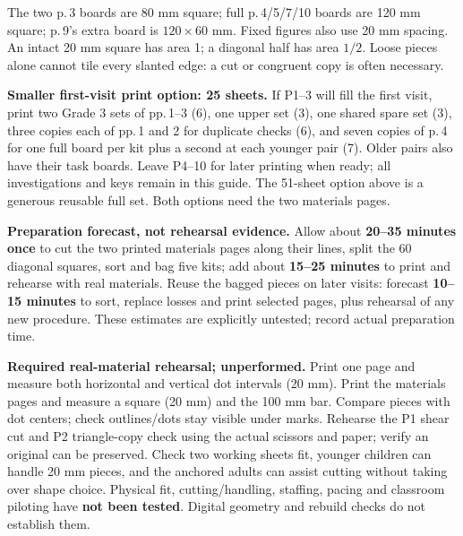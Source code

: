 \documentclass[letterpaper,11pt]{article}
\newcommand{\heading}[1]{\vspace{3pt}{\large\bfseries #1}\par}
\begin{document}
The two p.\,3 boards are 80 mm square; full p.\,4/5/7/10 boards are 120 mm square; p.\,9's extra board is $120\times60$ mm. Fixed figures also use 20 mm spacing. An intact 20 mm square has area 1; a diagonal half has area $1/2$. Loose pieces alone cannot tile every slanted edge: a cut or congruent copy is often necessary.

\textbf{Smaller first-visit print option: 25 sheets.} If P1--3 will fill the first visit, print two Grade 3 sets of pp.\,1--3 (6), one upper set (3), one shared spare set (3), three copies each of pp.\,1 and 2 for duplicate checks (6), and seven copies of p.\,4 for one full board per kit plus a second at each younger pair (7). Older pairs also have their task boards. Leave P4--10 for later printing when ready; all investigations and keys remain in this guide. The 51-sheet option above is a generous reusable full set. Both options need the two materials pages.

\textbf{Preparation forecast, not rehearsal evidence.} Allow about \textbf{20--35 minutes once} to cut the two printed materials pages along their lines, split the 60 diagonal squares, sort and bag five kits; add about \textbf{15--25 minutes} to print and rehearse with real materials. Reuse the bagged pieces on later visits: forecast \textbf{10--15 minutes} to sort, replace losses and print selected pages, plus rehearsal of any new procedure. These estimates are explicitly untested; record actual preparation time.

\textbf{Required real-material rehearsal; unperformed.} Print one page and measure both horizontal and vertical dot intervals (20 mm). Print the materials pages and measure a square (20 mm) and the 100 mm bar. Compare pieces with dot centers; check outlines/dots stay visible under marks. Rehearse the P1 shear cut and P2 triangle-copy check using the actual scissors and paper; verify an original can be preserved. Check two working sheets fit, younger children can handle 20 mm pieces, and the anchored adults can assist cutting without taking over shape choice. Physical fit, cutting/handling, staffing, pacing and classroom piloting have \textbf{not been tested}. Digital geometry and rebuild checks do not establish them.
\newpage

\heading{A first hour, with room to return}
\end{document}
